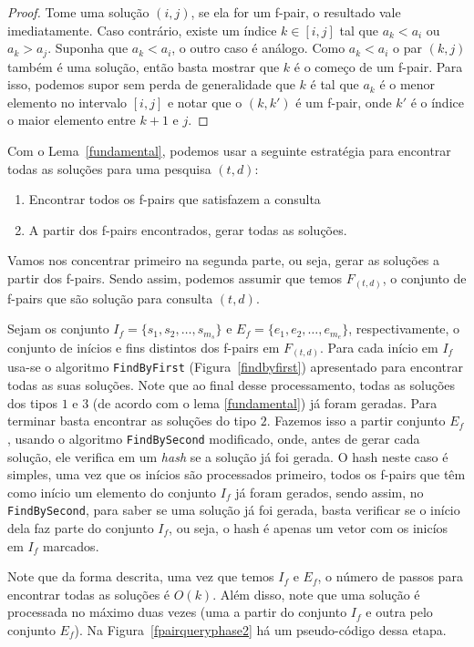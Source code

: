 \documentclass[12pt]{article}
\begin{document}
\begin{proof}
Tome uma solução $(i, j)$, se ela for um f-pair, o resultado vale imediatamente.
Caso contrário, existe um índice $k \in [i, j]$ tal que $a_k < a_i$ ou $a_k > a_j$.
Suponha que $a_k < a_i$, o outro caso é análogo. Como $a_k < a_i$ o par $(k, j)$ também
é uma solução, então basta mostrar que $k$ é o começo de um f-pair. Para isso, podemos
supor sem perda de generalidade que $k$ é tal que $a_k$ é o menor elemento no intervalo
$[i, j]$ e notar que o $(k, k')$ é um f-pair, onde $k'$ é o índice o maior elemento entre $k + 1$ e $j$.
\end{proof}

Com o Lema~\ref{fundamental}, podemos usar a seguinte estratégia 
para encontrar todas as soluções para uma pesquisa $(t,d)$:

\begin{enumerate}
\item Encontrar todos os f-pairs que satisfazem a consulta 
\item A partir dos f-pairs encontrados, gerar todas as soluções.
\end{enumerate}

Vamos nos concentrar primeiro na segunda parte, ou seja, gerar as soluções
a partir dos f-pairs. Sendo assim, podemos assumir que temos 
$F_{(t,d)}$, o conjunto de f-pairs que são solução para
consulta $(t,d)$. 

Sejam os conjunto $I_f = \{s_1, s_2, \ldots, s_{m_s}\}$
e $E_f = \{e_1, e_2, \ldots, e_{m_e}\}$, respectivamente, o conjunto de inícios e fins distintos
dos f-pairs em $F_{(t,d)}$. Para cada início em $I_f$ usa-se o algoritmo \verb|FindByFirst| (Figura~\ref{findbyfirst})
apresentado para encontrar todas as suas soluções.  Note que ao final desse processamento, todas
as soluções dos tipos $1$ e $3$ (de acordo com o lema \ref{fundamental}) já foram geradas. Para terminar
basta encontrar as soluções do tipo $2$. Fazemos isso  a partir conjunto $E_f$, usando o algoritmo
\verb|FindBySecond| modificado, onde, antes de gerar cada solução, ele verifica em um \textit{hash} se a solução
já foi gerada. O hash neste caso é simples, uma vez que os inícios são processados primeiro, todos os
f-pairs que têm como início um elemento do conjunto $I_f$ já foram gerados, sendo assim, no \verb|FindBySecond|,
para saber se uma solução já foi gerada, basta verificar se o início dela faz parte do conjunto $I_f$, ou seja,
o hash é apenas um vetor com os inicíos em $I_f$ marcados.

Note que da forma descrita, uma vez que temos $I_f$ e $E_f$, o número de passos para encontrar todas as soluções é $O(k)$.
Além disso, note que uma solução é processada no máximo duas vezes (uma a partir do conjunto $I_f$ e outra pelo conjunto $E_f$).
Na Figura~\ref{fpairqueryphase2} há um pseudo-código dessa etapa.
\end{document}

